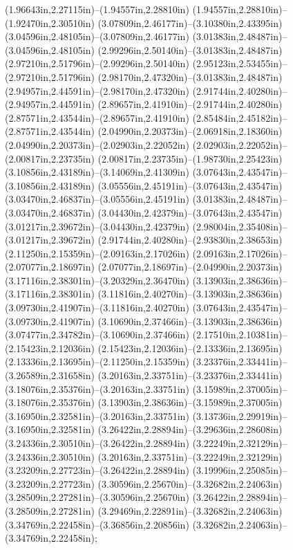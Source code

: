 (1.96643in,2.27115in)--(1.94557in,2.28810in) (1.94557in,2.28810in)--(1.92470in,2.30510in) (3.07809in,2.46177in)--(3.10380in,2.43395in) (3.04596in,2.48105in)--(3.07809in,2.46177in) (3.01383in,2.48487in)--(3.04596in,2.48105in) (2.99296in,2.50140in)--(3.01383in,2.48487in) (2.97210in,2.51796in)--(2.99296in,2.50140in) (2.95123in,2.53455in)--(2.97210in,2.51796in) (2.98170in,2.47320in)--(3.01383in,2.48487in) (2.94957in,2.44591in)--(2.98170in,2.47320in) (2.91744in,2.40280in)--(2.94957in,2.44591in) (2.89657in,2.41910in)--(2.91744in,2.40280in) (2.87571in,2.43544in)--(2.89657in,2.41910in) (2.85484in,2.45182in)--(2.87571in,2.43544in) (2.04990in,2.20373in)--(2.06918in,2.18360in) (2.04990in,2.20373in)--(2.02903in,2.22052in) (2.02903in,2.22052in)--(2.00817in,2.23735in) (2.00817in,2.23735in)--(1.98730in,2.25423in) (3.10856in,2.43189in)--(3.14069in,2.41309in) (3.07643in,2.43547in)--(3.10856in,2.43189in) (3.05556in,2.45191in)--(3.07643in,2.43547in) (3.03470in,2.46837in)--(3.05556in,2.45191in) (3.01383in,2.48487in)--(3.03470in,2.46837in) (3.04430in,2.42379in)--(3.07643in,2.43547in) (3.01217in,2.39672in)--(3.04430in,2.42379in) (2.98004in,2.35408in)--(3.01217in,2.39672in) (2.91744in,2.40280in)--(2.93830in,2.38653in) (2.11250in,2.15359in)--(2.09163in,2.17026in) (2.09163in,2.17026in)--(2.07077in,2.18697in) (2.07077in,2.18697in)--(2.04990in,2.20373in) (3.17116in,2.38301in)--(3.20329in,2.36470in) (3.13903in,2.38636in)--(3.17116in,2.38301in) (3.11816in,2.40270in)--(3.13903in,2.38636in) (3.09730in,2.41907in)--(3.11816in,2.40270in) (3.07643in,2.43547in)--(3.09730in,2.41907in) (3.10690in,2.37466in)--(3.13903in,2.38636in) (3.07477in,2.34782in)--(3.10690in,2.37466in) (2.17510in,2.10381in)--(2.15423in,2.12036in) (2.15423in,2.12036in)--(2.13336in,2.13695in) (2.13336in,2.13695in)--(2.11250in,2.15359in) (3.23376in,2.33441in)--(3.26589in,2.31658in) (3.20163in,2.33751in)--(3.23376in,2.33441in) (3.18076in,2.35376in)--(3.20163in,2.33751in) (3.15989in,2.37005in)--(3.18076in,2.35376in) (3.13903in,2.38636in)--(3.15989in,2.37005in) (3.16950in,2.32581in)--(3.20163in,2.33751in) (3.13736in,2.29919in)--(3.16950in,2.32581in) (3.26422in,2.28894in)--(3.29636in,2.28608in) (3.24336in,2.30510in)--(3.26422in,2.28894in) (3.22249in,2.32129in)--(3.24336in,2.30510in) (3.20163in,2.33751in)--(3.22249in,2.32129in) (3.23209in,2.27723in)--(3.26422in,2.28894in) (3.19996in,2.25085in)--(3.23209in,2.27723in) (3.30596in,2.25670in)--(3.32682in,2.24063in) (3.28509in,2.27281in)--(3.30596in,2.25670in) (3.26422in,2.28894in)--(3.28509in,2.27281in) (3.29469in,2.22891in)--(3.32682in,2.24063in) (3.34769in,2.22458in)--(3.36856in,2.20856in) (3.32682in,2.24063in)--(3.34769in,2.22458in);
